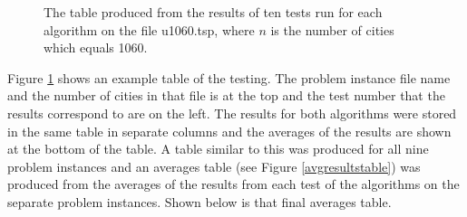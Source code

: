 \documentclass[conference,backref=page]{acmsiggraph}
\begin{document}
\begin{figure}[h]
	\begin{center}
		\caption{The table produced from the results of ten tests run for each algorithm on the file u1060.tsp, where $n$ is the number of cities which equals 1060.}
		\label{exampletesttable}
	\end{center}
\end{figure}

Figure \ref{exampletesttable} shows an example table of the testing. The problem instance file name and the number of cities in that file is at the top and the test number that the results correspond to are on the left. The results for both algorithms were stored in the same table in separate columns and the averages of the results are shown at the bottom of the table. A table similar to this was produced for all nine problem instances and an averages table (see Figure \ref{avgresultstable}) was produced from the averages of the results from each test of the algorithms on the separate problem instances. Shown below is that final averages table.
\end{document}
